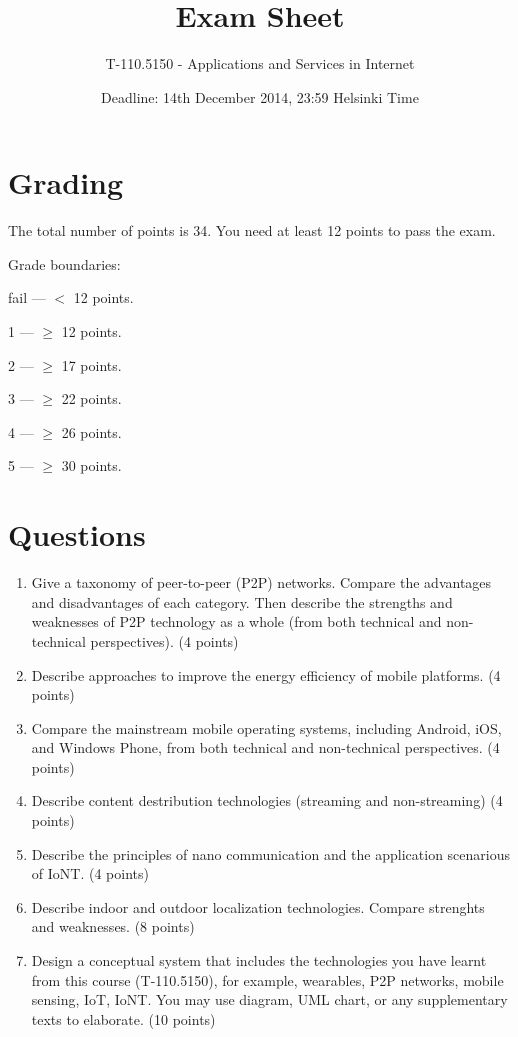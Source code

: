 \documentclass{article}
\title{\vspace{-10pt}Exam Sheet}
\author{T-110.5150 - Applications and Services in Internet}
\date{Deadline: 14th December 2014, 23:59 Helsinki Time}
\begin{document}
\maketitle

\section*{Grading}
\noindent
The total number of points is 34.
You need at least 12 points to pass the exam.

\noindent
Grade boundaries:
\vskip 10pt

fail --- $<$ 12 points.

1 --- $\ge$ 12 points.

2 --- $\ge$ 17 points.

3 --- $\ge$ 22 points.

4 --- $\ge$ 26 points.

5 --- $\ge$ 30 points.

\section*{Questions}

\begin{enumerate}

\item Give a taxonomy of peer-to-peer (P2P) networks. Compare the advantages and disadvantages of each category. Then describe the strengths and weaknesses of P2P technology as a whole (from both technical and non-technical perspectives). (4 points)

\item Describe approaches to improve the energy efficiency of mobile platforms. (4 points)

\item Compare the mainstream mobile operating systems, including Android, iOS, and Windows Phone, from both technical and non-technical perspectives. (4 points)

\item Describe content destribution technologies (streaming and non-streaming) (4 points)

\item Describe the principles of nano communication and the application scenarious of IoNT. (4 points)

\item Describe indoor and outdoor localization technologies. Compare strenghts and weaknesses. (8 points)

\item Design a conceptual system that includes the technologies you have learnt from this course (T-110.5150), for example, wearables, P2P networks, mobile sensing, IoT, IoNT. You may use diagram, UML chart, or any supplementary texts to elaborate. (10 points)



\end{enumerate}
\end{document}
